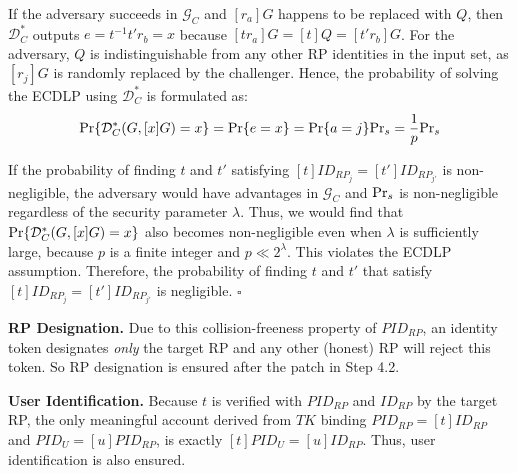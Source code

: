If the adversary succeeds in $\mathcal{G}_C$ and $[r_a]G$ happens to be replaced with $Q$, then $\mathcal{D}^*_C$ outputs $e=t^{-1}t'r_b =x$ because $[tr_a]G = [t]Q = [t'r_b]G$. For the adversary, $Q$ is indistinguishable from any other RP identities in the input set, as $[r_j]G$ is randomly replaced by the challenger.
Hence, the probability of solving the ECDLP using $\mathcal{D}^*_C$ is formulated as:
\begin{equation*}
{\rm Pr}\{\mathcal{D}^*_C(G, [x]G)=x\} = {\rm Pr}\{e = x\}={\rm Pr}\{a=j\}{\rm Pr}_s=\frac{1}{p}{\rm Pr}_s
\end{equation*}

If the probability of finding $t$ and $t'$ satisfying $[t]ID_{RP_j} = [t']ID_{RP_{j'}}$ is non-negligible, the adversary would have advantages  in $\mathcal{G}_C$ and ${\rm Pr}_s$ is non-negligible regardless of the security parameter $\lambda$.
Thus, we would find that ${\rm Pr}\{\mathcal{D}^*_C(G, [x]G)=x\}$ also becomes non-negligible even when $\lambda$ is sufficiently large, because $p$ is a finite integer and $p \ll 2^\lambda$.
This violates the ECDLP assumption. Therefore, the probability of finding $t$ and $t'$ that satisfy $[t]ID_{RP_j} = [t']ID_{RP_{j'}}$ is negligible.
\hfill $\square$
\vspace{1mm}

\noindent \textbf{RP Designation.} 
Due to this collision-freeness property of $PID_{RP}$,
    an identity token designates \emph{only} the target RP and any other (honest) RP will reject this token.
So RP designation is ensured after the patch in Step 4.2.

\noindent \textbf{User Identification.} 
Because $t$ is verified with $PID_{RP}$ and $ID_{RP}$ by the target RP,
 the only meaningful account derived
from $TK$ binding $PID_{RP}=[t]ID_{RP}$ and $PID_U = [u]PID_{RP}$,
 is exactly $[t]PID_U =[u]ID_{RP}$. Thus, user identification is also ensured.

